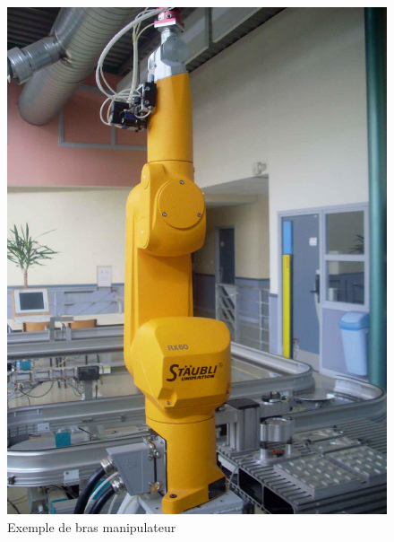\begin{figure}[htbp]
\begin{minipage}[c]{.48\linewidth}
\begin{center}
\includegraphics[width=\linewidth]{img/robot.jpg}
\caption{Exemple de bras manipulateur}
\label{fig:image4}
\end{center}
\end{minipage}
\hfill
\begin{minipage}[c]{.48\linewidth}
\begin{center}

\end{center}
\end{minipage}
\end{figure}
